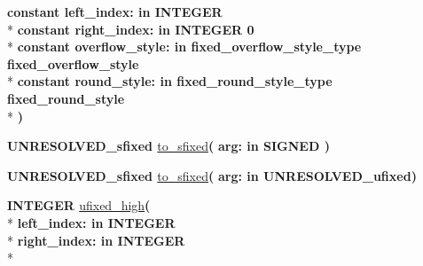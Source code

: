 \begin{DoxyCompactItemize}
{\bfseries {\bfseries \textcolor{keywordflow}{constant}\textcolor{vhdlchar}{ }}\textcolor{vhdlchar}{left\+\_\+index\+: }\textcolor{stringliteral}{in }{\bfseries \textcolor{comment}{I\+N\+T\+E\+G\+E\+R}\textcolor{vhdlchar}{ }}}\\*
{\bfseries {\bfseries \textcolor{keywordflow}{constant}\textcolor{vhdlchar}{ }}\textcolor{vhdlchar}{right\+\_\+index\+: }\textcolor{stringliteral}{in }\textcolor{vhdlchar}{I\+N\+T\+E\+G\+E\+R   0}}\\*
{\bfseries {\bfseries \textcolor{keywordflow}{constant}\textcolor{vhdlchar}{ }}\textcolor{vhdlchar}{overflow\+\_\+style\+: }\textcolor{stringliteral}{in }\textcolor{vhdlchar}{fixed\+\_\+overflow\+\_\+style\+\_\+type     fixed\+\_\+overflow\+\_\+style}}\\*
{\bfseries {\bfseries \textcolor{keywordflow}{constant}\textcolor{vhdlchar}{ }}\textcolor{vhdlchar}{round\+\_\+style\+: }\textcolor{stringliteral}{in }\textcolor{vhdlchar}{fixed\+\_\+round\+\_\+style\+\_\+type     fixed\+\_\+round\+\_\+style}}\\*
{\bfseries  )} 
\item 
{\bfseries {\bfseries \textcolor{vhdlchar}{U\+N\+R\+E\+S\+O\+L\+V\+E\+D\+\_\+sfixed}\textcolor{vhdlchar}{ }}} \hyperlink{class__fixed__pkg_a1f688b4a8b367776e7de9dfafd6d0b9b}{to\+\_\+sfixed}{\bfseries  ( }{\bfseries \textcolor{vhdlchar}{arg\+: }\textcolor{stringliteral}{in }{\bfseries \textcolor{comment}{S\+I\+G\+N\+E\+D}\textcolor{vhdlchar}{ }}}{\bfseries  )} 
\item 
{\bfseries {\bfseries \textcolor{vhdlchar}{U\+N\+R\+E\+S\+O\+L\+V\+E\+D\+\_\+sfixed}\textcolor{vhdlchar}{ }}} \hyperlink{class__fixed__pkg_a1f688b4a8b367776e7de9dfafd6d0b9b}{to\+\_\+sfixed}{\bfseries  ( }{\bfseries \textcolor{vhdlchar}{arg\+: }\textcolor{stringliteral}{in }\textcolor{vhdlchar}{U\+N\+R\+E\+S\+O\+L\+V\+E\+D\+\_\+ufixed}}{\bfseries  )} 
\item 
{\bfseries {\bfseries \textcolor{comment}{I\+N\+T\+E\+G\+E\+R}\textcolor{vhdlchar}{ }}} \hyperlink{class__fixed__pkg_ab7b73a5311a295da9f1c4e4fb4515ebb}{ufixed\+\_\+high}{\bfseries  ( }\\*
{\bfseries \textcolor{vhdlchar}{left\+\_\+index\+: }\textcolor{stringliteral}{in }{\bfseries \textcolor{comment}{I\+N\+T\+E\+G\+E\+R}\textcolor{vhdlchar}{ }}}\\*
{\bfseries \textcolor{vhdlchar}{right\+\_\+index\+: }\textcolor{stringliteral}{in }{\bfseries \textcolor{comment}{I\+N\+T\+E\+G\+E\+R}\textcolor{vhdlchar}{ }}}\\*

\end{DoxyCompactItemize}
